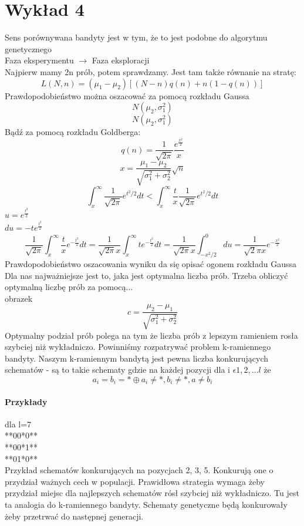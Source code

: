 \documentclass{article}
\begin{document}
		\section{Wykład 4}
			Sens porównywana bandyty jest w tym, że to jest podobne do algorytmu genetycznego \\
			Faza eksperymentu $\rightarrow$ Faza eksploracji \\
			Najpierw mamy 2n prób, potem sprawdzamy. Jest tam także równanie na stratę: 
			$$L(N,n)=(\mu_1-\mu_2)[(N-n)q(n)+n(1-q(n))]$$
			Prawdopodobieństwo można oszacować za pomocą rozkładu Gaussa
			$$N(\mu_2, \sigma^2_1)$$
			$$N(\mu_2, \sigma^2_1)$$
			Bądź za pomocą rozkładu Goldberga:
			$$q(n)=\frac{1}{\sqrt{2\pi}}\frac{e^{\frac{x^2}{2}}}{x}$$
			$$x=\frac{\mu_1-\mu_2}{\sqrt{\sigma_1^2 + \sigma_2^2}}\sqrt{n}$$
			$$\int_{x}^{\infty}\frac{1}{\sqrt{2\pi}}e^{t^2/2}dt < \int_{x}^{\infty}\frac{t}{x}\frac{1}{\sqrt{2\pi}}e^{t^2/2}dt$$
			$u=e^{\frac{t^2}{2}}$ \\
			$du = -te^{\frac{t^2}{2}}$ \\
			$$\frac{1}{\sqrt{2\pi}}\int_{x}^{\infty}\frac{t}{x}e^{-\frac{t^2}{2}}dt=
			\frac{1}{\sqrt{2\pi}x}\int_{x}^{\infty}te^{-\frac{t^2}{2}}dt=
			\frac{1}{\sqrt{2\pi}x}\int_{-x^2/2}^{0}du=
			\frac{1}{\sqrt{2}\pi x}e^{-\frac{x^2}{2}}$$
			Prawdopodobieństwo oszacowania wyniku da się opisać ogonem rozkładu Gaussa
			Dla nas najważniejsze jest to, jaka jest optymalna liczba prób.
			Trzeba obliczyć optymalną liczbę prób za pomocą... 
			\\ obrazek \\
			$$c=\frac{\mu_2-\mu_1}{\sqrt{\sigma_1^2+\sigma_2^2}}$$
			Optymalny podział prób polega na tym że liczba prób z lepszym ramieniem rosła szybciej niż wykładniczo.
			Powinniśmy rozpatrywać problem k-ramiennego bandyty.
			Naszym k-ramiennym bandytą jest pewna liczba konkurujących schematów - są to takie schematy gdzie na każdej pozycji dla i $\epsilon 1,2,...l$ że
			$$a_i = b_i = * \oplus
			a_i \neq *, b_i \neq *, a \neq b_i$$
			\paragraph{Przykłady} dla l=7 \\
			**00*0**\\
			**00*1**\\
			**01*0**\\
			Przykład schematów konkurujących na pozycjach 2, 3, 5. Konkurują one o przydział ważnych cech w populacji. Prawidłowa strategia wymaga żeby przydział miejsc dla najlepszych schematów rósł szybciej niż wykładniczo. Tu jest ta analogia do k-ramiennego bandyty. Schematy genetyczne będą konkurowały żeby przetrwać do następnej generacji. 
\end{document}

